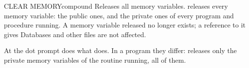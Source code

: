 \begin{XbaseEntry}{CLEAR MEMORY}{compound}%
Releases all memory variables.
\Syntax
{}
\Usage
{} releases every memory variable: the public ones, and the
private ones of every program and procedure running.  A memory variable
released no longer exists; a reference to it gives
  Databases and other files are not affected.

At the dot prompt  does what  does.  In a
program they differ:  releases only the private memory
variables of the routine running,  all of them.
\Examples
{}
\end{XbaseEntry}

